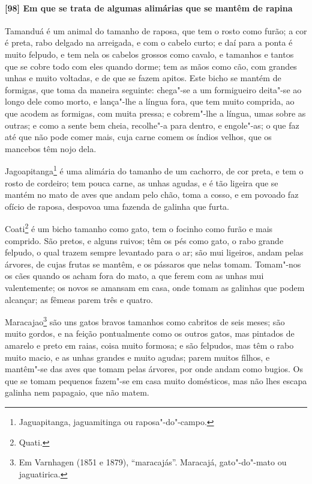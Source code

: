 \paragraph{[98] Em que se trata de algumas alimárias que se mantêm de rapina}\quad
Tamanduá é um animal do tamanho de raposa, que tem o rosto como furão; a cor é preta, rabo
delgado na arreigada, e com o cabelo curto; e daí para a ponta é muito felpudo, e tem nela
os cabelos grossos como cavalo, e tamanhos e tantos que se cobre todo com eles quando
dorme; tem as mãos como cão, com grandes unhas e muito voltadas, e de que se fazem apitos.
Este bicho se mantém de formigas, que toma da maneira seguinte: chega"-se a um formigueiro
deita"-se ao longo dele como morto, e lança"-lhe a língua fora, que tem muito comprida, ao
que acodem as formigas, com muita pressa; e cobrem"-lhe a língua, umas sobre as outras; e
como a sente bem cheia, recolhe"-a para dentro, e engole"-as; o que faz até que não pode
comer mais, cuja carne comem os índios velhos, que os mancebos têm nojo dela.

Jagoapitanga\footnote{ Jaguapitanga, jaguamitinga ou raposa"-do"-campo.} é uma alimária do
tamanho de um cachorro, de cor preta, e tem o rosto de cordeiro; tem pouca carne, as unhas
agudas, e é tão ligeira que se mantém no mato de aves que andam pelo chão, toma a cosso, e
em povoado faz ofício de raposa, despovoa uma fazenda de galinha que furta.

Coati\footnote{ Quati.} é um bicho tamanho como gato, tem o focinho como furão e mais
comprido. São pretos, e alguns ruivos; têm os pés como gato, o rabo grande felpudo, o qual
trazem sempre levantado para o ar; são mui ligeiros, andam pelas árvores, de cujas frutas
se mantêm, e os pássaros que nelas tomam. Tomam"-nos os cães quando os acham fora do mato,
a que ferem com as unhas mui valentemente; os novos se amansam em casa, onde tomam as
galinhas que podem alcançar; as fêmeas parem três e quatro.

Maracajao\footnote{Em Varnhagen (1851 e 1879), ``maracajás''. Maracajá, gato"-do"-mato ou
jaguatirica.} são uns gatos bravos tamanhos como cabritos de seis meses; são muito gordos,
e na feição pontualmente como os outros gatos, mas pintados de amarelo e preto em raias,
coisa muito formosa; e são felpudos, mas têm o rabo muito macio, e as unhas grandes e
muito agudas; parem muitos filhos, e mantêm"-se das aves que tomam pelas árvores, por onde
andam como bugios. Os que se tomam pequenos fazem"-se em casa muito domésticos, mas não
lhes escapa galinha nem papagaio, que não matem.


